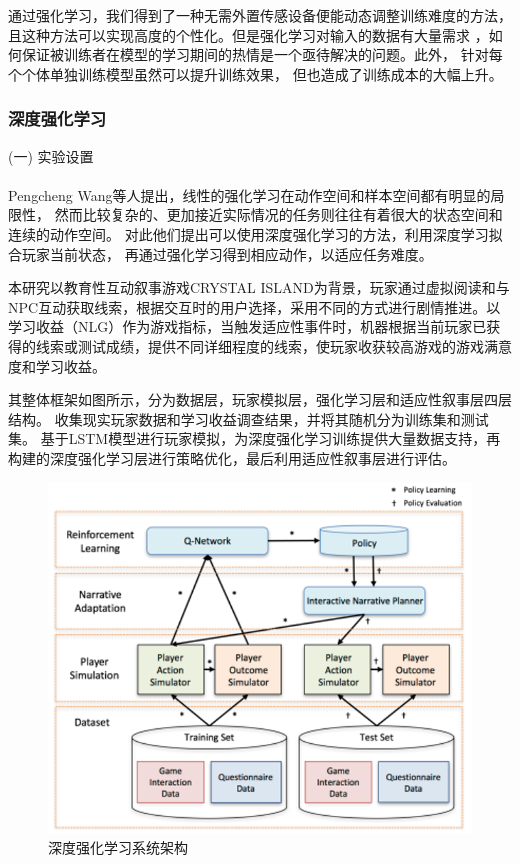 \documentclass{article}
\begin{document}
            通过强化学习，我们得到了一种无需外置传感设备便能动态调整训练难度的方法，
            且这种方法可以实现高度的个性化。但是强化学习对输入的数据有大量需求
            ，如何保证被训练者在模型的学习期间的热情是一个亟待解决的问题。此外，
            针对每个个体单独训练模型虽然可以提升训练效果，
            但也造成了训练成本的大幅上升。

            \subsubsection{深度强化学习}
            (一) 实验设置\paragraph{}
            Pengcheng Wang\cite{ref12}等人提出，线性的强化学习在动作空间和样本空间都有明显的局限性，
            然而比较复杂的、更加接近实际情况的任务则往往有着很大的状态空间和连续的动作空间。
            对此他们提出可以使用深度强化学习的方法，利用深度学习拟合玩家当前状态，
            再通过强化学习得到相应动作，以适应任务难度。

            本研究以教育性互动叙事游戏CRYSTAL ISLAND为背景，玩家通过虚拟阅读和与NPC互动获取线索，根据交互时的用户选择，采用不同的方式进行剧情推进。以学习收益（NLG）作为游戏指标，当触发适应性事件时，机器根据当前玩家已获得的线索或测试成绩，提供不同详细程度的线索，使玩家收获较高游戏的游戏满意度和学习收益。
            
            其整体框架如图所示，分为数据层，玩家模拟层，强化学习层和适应性叙事层四层结构。
            收集现实玩家数据和学习收益调查结果，并将其随机分为训练集和测试集。
            基于LSTM模型进行玩家模拟，为深度强化学习训练提供大量数据支持，再构建的深度强化学习层进行策略优化，最后利用适应性叙事层进行评估。
            \begin{figure}[H]
            	
            	\centering
            	\includegraphics[scale=0.5]{images/RL_architecture.png}
            	\caption{深度强化学习系统架构}
            	\label{fig:label}
            \end{figure}
\end{document}
